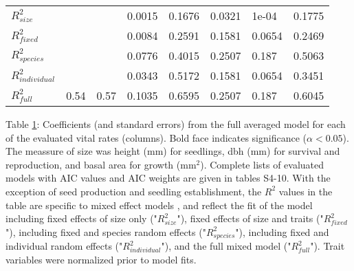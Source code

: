 \documentclass[b5paper,justified]{tufte-book} %
\begin{document}
\begin{fullwidth}
\begin{landscape}
\begin{table}
\begin{center}
\begin{tabular}{p{1.1cm}p{2.1cm}p{1.8cm}p{2cm}p{2cm}p{2cm}p{2cm}p{2cm}}
   \hline
$R^{2}_{size}$ &  &  & 0.0015 & 0.1676 & 0.0321 & 1e-04 & 0.1775 \\ 
  $R^{2}_{fixed}$ &  &  & 0.0084 & 0.2591 & 0.1581 & 0.0654 & 0.2469 \\ 
  $R^{2}_{species}$ &  &  & 0.0776 & 0.4015 & 0.2507 & 0.187 & 0.5063 \\ 
  $R^{2}_{individual}$ &  &  & 0.0343 & 0.5172 & 0.1581 & 0.0654 & 0.3451 \\ 
  $R^{2}_{full}$ & 0.54 & 0.57 & 0.1035 & 0.6595 & 0.2507 & 0.187 & 0.6045 \\ 
   \hline
\end{tabular}
\label{tab:chap5tab3}
\hspace*{4.5cm}\begin{minipage}{18cm} Table \ref{tab:chap5tab3}: Coefficients (and standard errors) from the full averaged model for each of the evaluated vital rates (columns). Bold face indicates significance ($\alpha<0.05$). The meassure of size was height (mm) for seedlings, dbh (mm) for survival and reproduction, and basal area for growth (mm$^2$). Complete lists of evaluated models with AIC values and AIC weights are given in tables S4-10. With the exception of seed production and seedling establishment, the $R^{2}$ values in the table are specific to mixed effect models \citep{Nakagawa2013}, and reflect the fit of the model including fixed effects of size only ("$R^{2}_{size}$"), fixed effects of size and traits ("$R^{2}_{fixed}$"), including fixed and species random effects ("$R^{2}_{species}$"), including fixed and individual random effects ("$R^{2}_{individual}$"), and the full mixed model ("$R^{2}_{full}$"). Trait variables were normalized prior to model fits. \end{minipage} 
\end{center}
\end{table}
\end{landscape}



\end{fullwidth}
\end{document}

